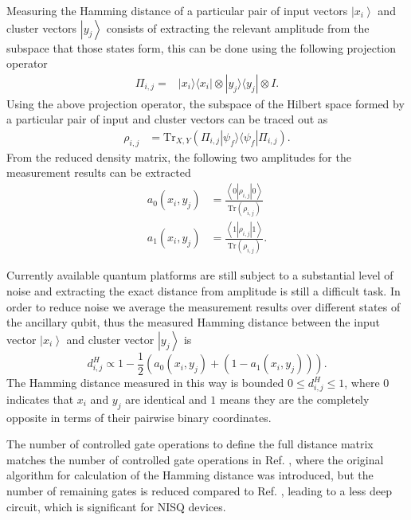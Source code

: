 \documentclass[pra,showkeys,twocolumn,showpacs,aps,10pt]{revtex4-1}
\begin{document}
Measuring the Hamming distance of a particular pair of input vectors $\left| x_i \right\rangle$ and cluster vectors $\left| y_j \right\rangle$ consists of extracting the relevant amplitude from the subspace that those states form,
this can be done using the following projection operator
%
\begin{align}
\Pi_{i,j} = &\left| x_i \rangle\langle x_i \right| \otimes \left| y_j \rangle\langle y_j \right| \otimes I .
\end{align}
%
Using the above projection operator, the subspace of the Hilbert space formed by a particular pair of input and cluster vectors can be traced out as
%
\begin{align}
    \rho_{i,j} &= \text{Tr}_{X,Y} (\Pi_{i,j} \left| \psi_f \rangle\langle \psi_f \right| \Pi_{i,j}) .
\end{align}
%
From the reduced density matrix, the following two amplitudes for the measurement results can be extracted
%
\begin{align}
    a_0(x_i,y_j) & = \frac{\left\langle 0 |\rho_{i,j}| 0 \right\rangle}{\text{Tr}(\rho_{i,j})}  \\
    a_1(x_i,y_j) & = \frac{\left\langle 1 |\rho_{i,j}| 1 \right\rangle}{\text{Tr}(\rho_{i,j})} .
\end{align}
%






Currently available quantum platforms are still subject to a substantial level of noise and extracting the exact distance from amplitude is still a difficult task. In order to reduce noise we average the measurement results over different states of the ancillary qubit, thus the measured Hamming distance between the input vector $\left| x_i \right\rangle$ and cluster vector $\left| y_j \right\rangle$ is
%
\begin{equation}\label{eq:amplitudes2distance}
    d_{i,j}^H \propto 1 - \frac{1}{2}(a_0(x_i,y_j) + (1-a_1(x_i,y_j))).
\end{equation}
%
The Hamming distance measured in this way is bounded $0 \leq d_{i,j}^H \leq 1$,
where  $0$ indicates that $x_i$ and $y_j$ are identical and $1$ means they are the completely opposite in terms of their pairwise binary coordinates.

The number of controlled gate operations to define the full distance matrix matches the number of controlled gate operations in Ref. \cite{trugenberger2001}, where the original algorithm for calculation of the Hamming distance was introduced, but the number of remaining gates is reduced compared to Ref. \cite{trugenberger2001}, leading to a less deep circuit, which is significant for NISQ devices.
\end{document}
